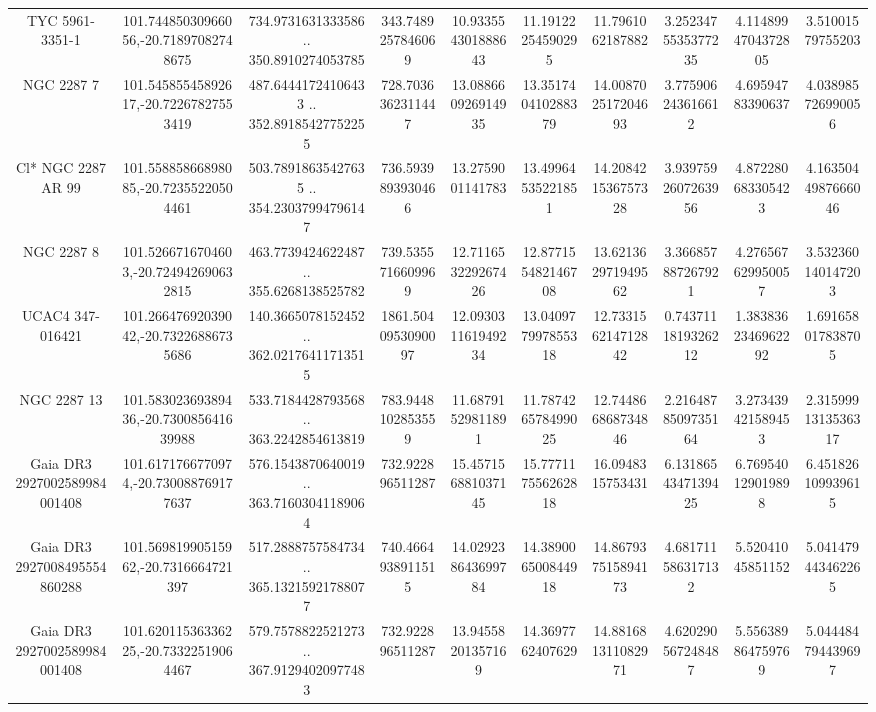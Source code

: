 \begin{table}
\begin{tabular}{cccccccccc}
TYC 5961-3351-1 & 101.74485030966056,-20.71897082748675 & 734.9731631333586 .. 350.8910274053785 & 343.7489257846069 & 10.933554301888643 & 11.19122254590295 & 11.7961062187882 & 3.2523475535377235 & 4.1148994704372805 & 3.51001579755203 \\
NGC  2287     7 & 101.54585545892617,-20.72267827553419 & 487.64441724106433 .. 352.89185427752255 & 728.7036362311447 & 13.088660926914935 & 13.351740410288379 & 14.008702517204693 & 3.775906243616612 & 4.69594783390637 & 4.038985726990056 \\
Cl* NGC 2287     AR      99 & 101.55885866898085,-20.72355220504461 & 503.78918635427635 .. 354.23037994796147 & 736.5939893930466 & 13.2759001141783 & 13.49964535221851 & 14.208421536757328 & 3.9397592607263956 & 4.872280683305423 & 4.1635044987666046 \\
NGC  2287     8 & 101.5266716704603,-20.724942690632815 & 463.7739424622487 .. 355.6268138525782 & 739.5355716609969 & 12.711653229267426 & 12.877155482146708 & 13.621362971949562 & 3.366857887267921 & 4.276567629950057 & 3.532360140147203 \\
UCAC4 347-016421 & 101.26647692039042,-20.73226886735686 & 140.3665078152452 .. 362.02176411713515 & 1861.5040953090097 & 12.093031161949234 & 13.040977997855318 & 12.733156214712842 & 0.7437111819326212 & 1.3838362346962292 & 1.691658017838705 \\
NGC  2287    13 & 101.58302369389436,-20.730085641639988 & 533.7184428793568 .. 363.2242854613819 & 783.9448102853559 & 11.68791529811891 & 11.787426578499025 & 12.744866868734846 & 2.2164878509735164 & 3.273439421589453 & 2.3159991313536317 \\
Gaia DR3 2927002589984001408 & 101.6171766770974,-20.730088769177637 & 576.1543870640019 .. 363.71603041189064 & 732.922896511287 & 15.457156881037145 & 15.777117556262818 & 16.0948315753431 & 6.1318654347139425 & 6.769540129019898 & 6.451826109939615 \\
Gaia DR3 2927008495554860288 & 101.56981990515962,-20.7316664721397 & 517.2888757584734 .. 365.13215921788077 & 740.4664938911515 & 14.029238643699784 & 14.389006500844918 & 14.867937515894173 & 4.681711586317132 & 5.52041045851152 & 5.041479443462265 \\
Gaia DR3 2927002589984001408 & 101.62011536336225,-20.73322519064467 & 579.7578822521273 .. 367.91294020977483 & 732.922896511287 & 13.94558201357169 & 14.3697762407629 & 14.881681311082971 & 4.620290567248487 & 5.556389864759769 & 5.044484794439697 \\

\end{tabular}
\end{table}
